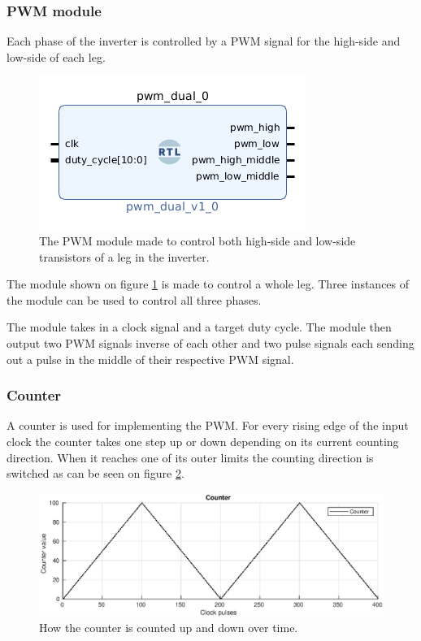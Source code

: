\subsubsection{PWM module}
\label{sec:pwm}
Each phase of the inverter is controlled by a PWM signal for the high-side and low-side of each leg.
\begin{figure}[H]
	\centering
	\includegraphics[width=0.5 \textwidth]{pictures/software/pwm_module.png}
	\caption{The PWM module made to control both high-side and low-side transistors of a leg in the inverter.}
	\label{fig:pwm_module}
\end{figure}
The module shown on figure \ref{fig:pwm_module} is made to control a whole leg. Three instances of the module can be used to control all three phases.

The module takes in a clock signal and a target duty cycle. The module then output two PWM signals inverse of each other and two pulse signals each sending out a pulse in the middle of their respective PWM signal.


\subsubsection*{Counter}
A counter is used for implementing the PWM. For every rising edge of the input clock the counter takes one step up or down depending on its current counting direction. When it reaches one of its outer limits the counting direction is switched as can be seen on figure \ref{fig:counter}.

\begin{figure}[H]
	\centering
	\includegraphics[width=1 \textwidth]{pictures/software/counter.eps}
	\caption{How the counter is counted up and down over time.}
	\label{fig:counter}
\end{figure}

